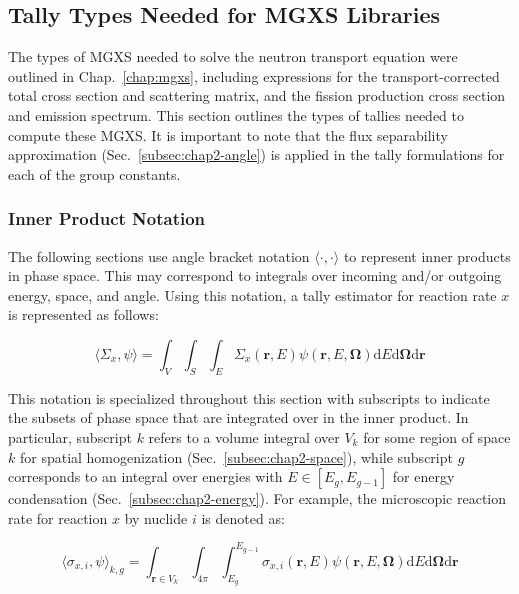 \subsection{Tally Types Needed for \ac{MGXS} Libraries}
\label{subsec:chap3-tally-types}

The types of \ac{MGXS} needed to solve the neutron transport equation were outlined in Chap.~\ref{chap:mgxs}, including expressions for the transport-corrected total cross section and scattering matrix, and the fission production cross section and emission spectrum. This section outlines the types of tallies needed to compute these \ac{MGXS}. It is important to note that the flux separability approximation (Sec.~\ref{subsec:chap2-angle}) is applied in the tally formulations for each of the group constants.

\subsubsection{Inner Product Notation}
\label{subsec:chap3-tally-types-notation}

The following sections use angle bracket notation $\langle \cdot , \cdot \rangle$ to represent inner products in phase space. This may correspond to integrals over incoming and/or outgoing energy, space, and angle. Using this notation, a tally estimator for reaction rate $x$ is represented as follows: 

\begin{equation}
\label{eqn:chap3-inner-prod-notation}
\langle \Sigma_x, \psi \rangle = \int_{V} \int_{S} \int_{E} \Sigma_{x}(\mathbf{r},E)\psi(\mathbf{r},E,\mathbf{\Omega}) \mathrm{d}E\mathrm{d}\mathbf{\Omega}\mathrm{d}\mathbf{r}
\end{equation}

\noindent This notation is specialized throughout this section with subscripts to indicate the subsets of phase space that are integrated over in the inner product. In particular, subscript $k$ refers to a volume integral over $V_{k}$ for some region of space $k$ for spatial homogenization (Sec.~\ref{subsec:chap2-space}), while subscript $g$ corresponds to an integral over energies with $E \in [E_{g}, E_{g-1}]$ for energy condensation (Sec.~\ref{subsec:chap2-energy}). For example, the microscopic reaction rate for reaction $x$ by nuclide $i$ is denoted as:

\begin{equation}
\label{eqn:chap3-angle-rxn-rate}
\langle \sigma_{x,i}, \psi \rangle_{k,g} = \int_{\mathbf{r} \in V_{k}} \int_{4\pi} \int_{E_{g}}^{E_{g-1}} \sigma_{x,i}(\mathbf{r},E)\psi(\mathbf{r},E,\mathbf{\Omega}) \mathrm{d}E\mathrm{d}\mathbf{\Omega}\mathrm{d}\mathbf{r}
\end{equation}

